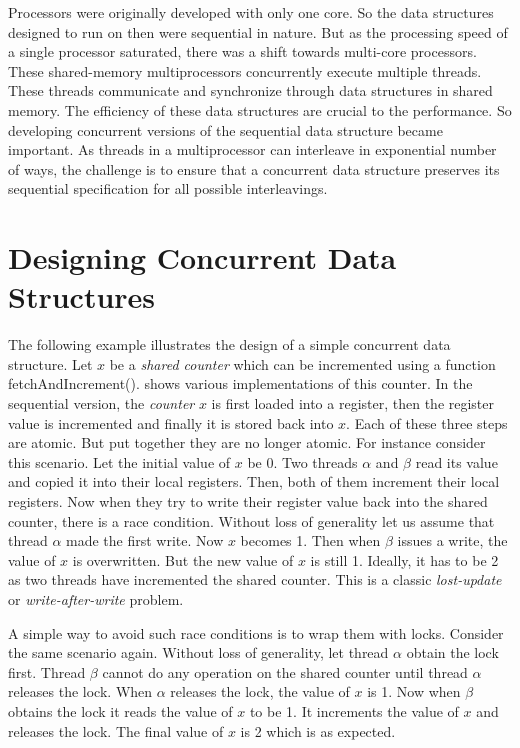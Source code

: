 Processors were originally developed with only one core. So the data structures designed to run on then were sequential in nature.
But as the processing speed of a single processor saturated, there was a shift towards multi-core processors.
These shared-memory multiprocessors concurrently execute multiple threads.
These threads communicate and synchronize through data structures in shared memory.
The efficiency of these data structures are crucial to the performance.
So developing concurrent versions of the sequential data structure became important.
As threads in a multiprocessor can interleave in exponential number of ways, the challenge is to ensure that a concurrent data structure preserves its sequential specification for all possible interleavings.

\section{Designing Concurrent Data Structures}
The following example illustrates the design of a simple concurrent data structure.
Let $x$ be a \emph{shared counter} which can be incremented using a function fetchAndIncrement().
 shows various implementations of this counter.
In the sequential version, the \emph{counter} $x$ is first loaded into a register, then the register value is incremented and finally it is stored back into $x$.
Each of these three steps are atomic. But put together they are no longer atomic.
For instance consider this scenario. Let the initial value of $x$ be 0.
Two threads $\alpha$ and $\beta$ read its value and copied it into their local registers.
Then, both of them increment their local registers. Now when they try to write their register value back into the shared counter, there is a race condition.
Without loss of generality let us assume that thread $\alpha$ made the first write. Now $x$ becomes 1.
Then when $\beta$ issues a write, the value of $x$ is overwritten. But the new value of $x$ is still 1.
Ideally, it has to be 2 as two threads have incremented the shared counter.
This is a classic \emph{lost-update} or \emph{write-after-write} problem.



A simple way to avoid such race conditions is to wrap them with locks.
Consider the same scenario again. Without loss of generality, let thread $\alpha$ obtain the lock first.
Thread $\beta$ cannot do any operation on the shared counter until thread $\alpha$ releases the lock.
When $\alpha$ releases the lock, the value of $x$ is 1.
Now when $\beta$ obtains the lock it reads the value of $x$ to be 1.
It increments the value of $x$ and releases the lock.
The final value of $x$ is 2 which is as expected.

